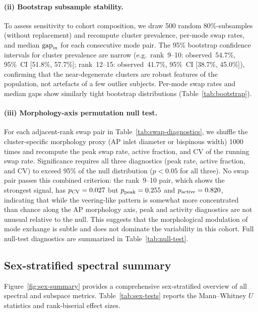 \documentclass[11pt]{article}
\begin{document}
\paragraph{(ii) Bootstrap subsample stability.}
To assess sensitivity to cohort composition, we draw 500 random 80\%-subsamples (without replacement) and recompute cluster prevalence, per-mode swap rates, and median $\mathrm{gap}_{\rm in}$ for each consecutive mode pair.
The 95\% bootstrap confidence intervals for cluster prevalence are narrow (e.g.\ rank~9--10: observed~54.7\%, 95\%~CI [51.8\%, 57.7\%]; rank~12--15: observed~41.7\%, 95\%~CI [38.7\%, 45.0\%]), confirming that the near-degenerate clusters are robust features of the population, not artefacts of a few outlier subjects.
Per-mode swap rates and median gaps show similarly tight bootstrap distributions (Table~\ref{tab:bootstrap}).

\paragraph{(iii) Morphology-axis permutation null test.}
For each adjacent-rank swap pair in Table~\ref{tab:swap-diagnostics}, we shuffle the cluster-specific morphology proxy (AP inlet diameter or bispinous width) 1000 times and recompute the peak swap rate, active fraction, and CV of the running swap rate.
Significance requires all three diagnostics (peak rate, active fraction, and CV) to exceed 95\% of the null distribution ($p < 0.05$ for all three).
No swap pair passes this combined criterion: the rank~9--10 pair, which shows the strongest signal, has $p_{\rm CV} = 0.027$ but $p_{\rm peak} = 0.255$ and $p_{\rm active} = 0.820$, indicating that while the veering-like pattern is somewhat more concentrated than chance along the AP morphology axis, peak and activity diagnostics are not unusual relative to the null.
This suggests that the morphological modulation of mode exchange is subtle and does not dominate the variability in this cohort.
Full null-test diagnostics are summarized in Table~\ref{tab:null-test}.

\subsection{Sex-stratified spectral summary}

Figure~\ref{fig:sex-summary} provides a comprehensive sex-stratified overview of all spectral and subspace metrics.
Table~\ref{tab:sex-tests} reports the Mann--Whitney $U$ statistics and rank-biserial effect sizes.
\end{document}

